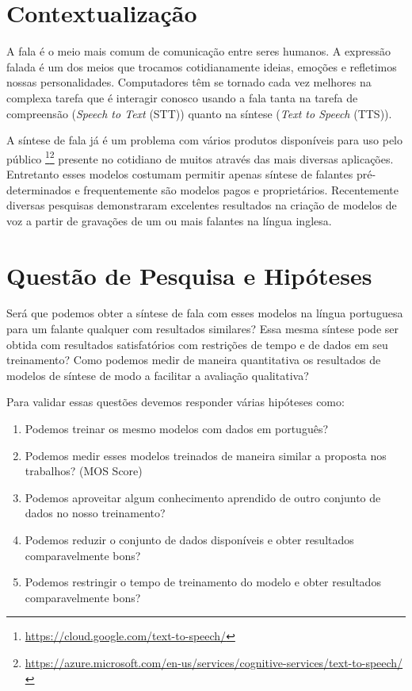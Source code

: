 \documentclass{article}
\begin{document}
\section{Contextualização}
A fala é o meio mais comum de comunicação entre seres humanos\cite{flanang}. 
A expressão falada é um dos meios que trocamos cotidianamente ideias, emoções e refletimos nossas personalidades\cite{Tiwari2012}. 
Computadores têm se tornado cada vez melhores na complexa tarefa que é interagir conosco usando a fala \cite{HCI-voice} tanta na tarefa de compreensão (\emph{Speech to Text} (STT)) quanto na síntese (\emph{Text to Speech} (TTS)). 

A síntese de fala já é um problema com vários produtos disponíveis para uso pelo público \footnote{\url{https://cloud.google.com/text-to-speech/}}\footnote{\url{https://azure.microsoft.com/en-us/services/cognitive-services/text-to-speech/}} presente no cotidiano de muitos através das mais diversas aplicações.
Entretanto esses modelos costumam permitir apenas síntese de falantes pré-determinados e frequentemente são modelos pagos e proprietários. 
Recentemente diversas pesquisas demonstraram excelentes resultados na criação de modelos de voz a partir de gravações de um ou mais falantes na língua inglesa\cite{deepvoice3:DBLP:journals/corr/abs-1710-07654,baidu_voice_clonning:DBLP:journals/corr/abs-1802-06006,facebook:DBLP:journals/corr/TaigmanWPN17,speech_adaptation,wavenet,deepVoice,deepVoice2,deepvoice3:DBLP:journals/corr/abs-1710-07654}.

\section{Questão de Pesquisa e Hipóteses}
Será que podemos obter a síntese de fala com esses modelos na língua portuguesa para um falante qualquer com resultados similares?
Essa mesma síntese pode ser obtida com resultados satisfatórios com restrições de tempo e de dados em seu treinamento?
Como podemos medir de maneira quantitativa os resultados de modelos de síntese de modo a facilitar a avaliação qualitativa?

Para validar essas questões devemos responder várias hipóteses como:

\begin{enumerate}
	\item \label{it:h1} Podemos treinar os mesmo modelos com dados em português?
	\item \label{it:h2} Podemos medir esses modelos treinados de maneira similar a proposta nos trabalhos? (MOS Score)
	\item \label{it:h3} Podemos aproveitar algum conhecimento aprendido de outro conjunto de dados no nosso treinamento? 
	\item \label{it:h4} Podemos reduzir o conjunto de dados disponíveis e obter resultados comparavelmente bons?
	\item \label{it:h5} Podemos restringir o tempo de treinamento do modelo e obter resultados comparavelmente bons?
\end{enumerate}
\end{document}
